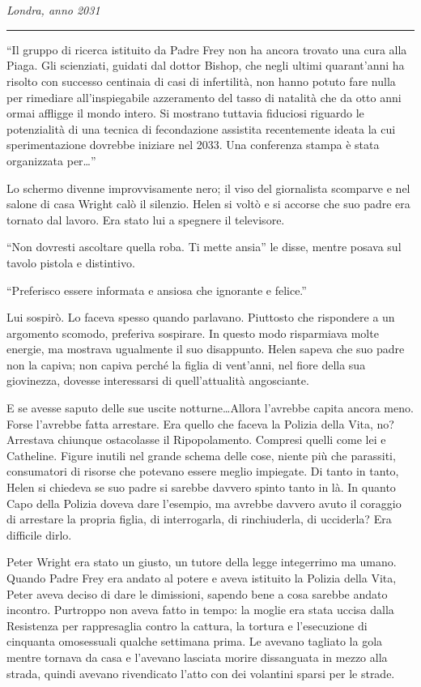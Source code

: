 \chapter{}
\label{ch:2}

\emph{Londra, anno 2031}
\plainbreak{1}

``Il gruppo di ricerca istituito da Padre Frey non ha ancora trovato una cura alla Piaga. Gli
scienziati, guidati dal dottor Bishop, che negli ultimi quarant'anni ha risolto con successo
centinaia di casi di infertilità, non hanno potuto fare nulla per rimediare all'inspiegabile
azzeramento del tasso di natalità che da otto anni ormai affligge il mondo intero. Si mostrano
tuttavia fiduciosi riguardo le potenzialità di una tecnica di fecondazione assistita recentemente
ideata la cui sperimentazione dovrebbe iniziare nel 2033. Una conferenza stampa è stata organizzata
per\dots''

Lo schermo divenne improvvisamente nero; il viso del giornalista scomparve e nel salone di casa
Wright calò il silenzio. Helen si voltò e si accorse che suo padre era tornato dal lavoro. Era stato
lui a spegnere il televisore.

``Non dovresti ascoltare quella roba. Ti mette ansia'' le disse, mentre posava sul tavolo pistola e
distintivo.

``Preferisco essere informata e ansiosa che ignorante e felice.''

Lui sospirò. Lo faceva spesso quando parlavano. Piuttosto che rispondere a un argomento scomodo,
preferiva sospirare. In questo modo risparmiava molte energie, ma mostrava ugualmente il suo
disappunto. Helen sapeva che suo padre non la capiva; non capiva perché la figlia di vent'anni, nel
fiore della sua giovinezza, dovesse interessarsi di quell'attualità angosciante.

E se avesse saputo delle sue uscite notturne\dots Allora l'avrebbe capita ancora meno. Forse
l'avrebbe fatta arrestare. Era quello che faceva la Polizia della Vita, no? Arrestava chiunque
ostacolasse il Ripopolamento. Compresi quelli come lei e Catheline. Figure inutili nel grande schema
delle cose, niente più che parassiti, consumatori di risorse che potevano essere meglio impiegate.
Di tanto in tanto, Helen si chiedeva se suo padre si sarebbe davvero spinto tanto in là. In quanto
Capo della Polizia doveva dare l'esempio, ma avrebbe davvero avuto il coraggio di arrestare la
propria figlia, di interrogarla, di rinchiuderla, di ucciderla? Era difficile dirlo.

Peter Wright era stato un giusto, un tutore della legge integerrimo ma umano. Quando Padre Frey era
andato al potere e aveva istituito la Polizia della Vita, Peter aveva deciso di dare le dimissioni,
sapendo bene a cosa sarebbe andato incontro. Purtroppo non aveva fatto in tempo: la moglie era stata
uccisa dalla Resistenza per rappresaglia contro la cattura, la tortura e l'esecuzione di cinquanta
omosessuali qualche settimana prima. Le avevano tagliato la gola mentre tornava da casa e l'avevano
lasciata morire dissanguata in mezzo alla strada, quindi avevano rivendicato l'atto con dei
volantini sparsi per le strade.


